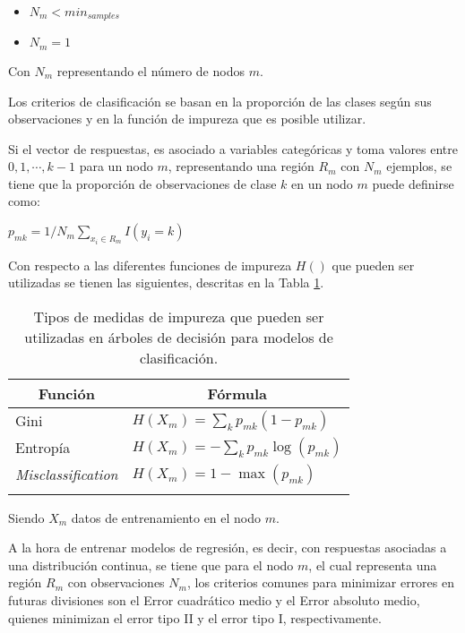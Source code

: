 \begin{itemize}
	
	\item $N_{m} < min_{samples}$ 
	
	\item $N_{m} = 1$
\end{itemize}

Con $N_{m}$ representando el número de nodos $m$.

Los criterios de clasificación se basan en la proporción de las clases según sus observaciones y en la función de impureza que es posible utilizar.

Si el vector de respuestas, es asociado a variables categóricas y toma valores entre $0,1,\cdots,k-1$ para un nodo $m$, representando una región $R_{m}$ con $N_{m}$ ejemplos, se tiene que la proporción  de observaciones de clase $k$ en un nodo $m$ puede definirse como:

\begin{center}
	$p_{mk} = 1/ N_m \sum_{x_i \in R_m} I(y_i = k)$
\end{center}

Con respecto a las diferentes funciones de impureza $H()$ que pueden ser utilizadas se tienen las siguientes, descritas en la Tabla \ref{tab:tab-form-impureza}. 

\begin{longtable}[c]{|l|l|}
	\hline
	\multicolumn{1}{|c|}{\textbf{Función}} & \multicolumn{1}{c|}{\textbf{Fórmula}}   \\ \hline
	\endfirsthead
	\endhead
	Gini                                   & $H(X_m) = \sum_k p_{mk} (1 - p_{mk})$   \\ \hline
	Entropía                               & $H(X_m) = - \sum_k p_{mk} \log(p_{mk})$ \\ \hline
	\textit{Misclassification}                      & $H(X_m) = 1 - \max(p_{mk})$             \\ \hline
	\caption{Tipos de medidas de impureza que pueden ser utilizadas en árboles de decisión para modelos de clasificación.
	}
	\label{tab:tab-form-impureza}\\
\end{longtable} 

Siendo $X_{m}$ datos de entrenamiento en el nodo $m$.

A la hora de entrenar modelos de regresión, es decir, con respuestas asociadas a una distribución continua, se tiene que para el nodo $m$, el cual representa una región $R_{m}$ con observaciones $N_{m}$, los criterios comunes para minimizar errores en futuras divisiones son el Error cuadrático medio y el Error absoluto medio, quienes minimizan el error tipo II y el error tipo I, respectivamente.

